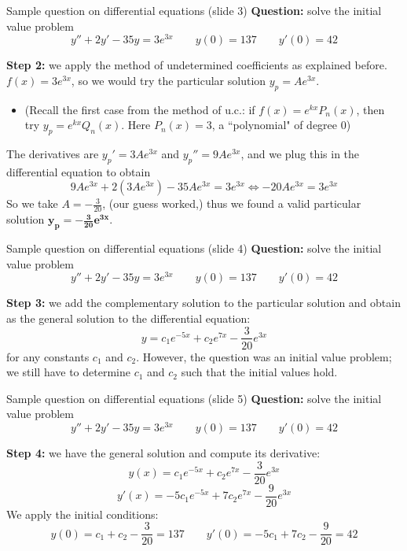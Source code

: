 \begin{frame}{Sample question on differential equations (slide 3)}
    \textbf{Question:} solve the initial value problem \[y''+2y'-35y=3e^{3x}\qquad y(0)=137\qquad y'(0)=42\]
    
    \textbf{Step 2:} we apply the method of undetermined coefficients as explained before. $f(x)=3e^{3x}$, so we would try the particular solution $y_p=Ae^{3x}$.
    \begin{itemize}
    \item{\scriptsize(Recall the first case from the method of u.c.: if $f(x)=e^{kx}P_n(x)$, then try $y_p=e^{kx}Q_n(x)$. Here $P_n(x)=3$, a ``polynomial" of degree 0)}
    \end{itemize}
    The derivatives are $y_p'=3Ae^{3x}$ and $y_p''=9Ae^{3x}$, and we plug this in the differential equation to obtain
    \[9Ae^{3x}+2(3Ae^{3x})-35Ae^{3x}=3e^{3x}\iff-20Ae^{3x}=3e^{3x}\]
    So we take $A=-\frac{3}{20}$, (our guess worked,) thus we found a valid particular solution $\pmb{y_p=-\frac{3}{20}e^{3x}}$.

\end{frame}

\begin{frame}{Sample question on differential equations (slide 4)}
    \textbf{Question:} solve the initial value problem \[y''+2y'-35y=3e^{3x}\qquad y(0)=137\qquad y'(0)=42\]
    
    \textbf{Step 3:} we add the complementary solution to the particular solution and obtain as the general solution to the differential equation: \[y=c_1e^{-5x} + c_2e^{7x}-\frac{3}{20}e^{3x}\] for any constants $c_1$ and $c_2$. However, the question was an initial value problem; we still have to determine $c_1$ and $c_2$ such that the initial values hold.

\end{frame}

\begin{frame}{Sample question on differential equations (slide 5)}
    \textbf{Question:} solve the initial value problem \[y''+2y'-35y=3e^{3x}\qquad y(0)=137\qquad y'(0)=42\]
    
    \textbf{Step 4:} we have the general solution and compute its derivative: \[y(x)=c_1e^{-5x} + c_2e^{7x}-\frac{3}{20}e^{3x}\]  \vspace{-5mm}\[y'(x)=-5c_1e^{-5x}+7c_2e^{7x}-\frac{9}{20}e^{3x}\]
    We apply the initial conditions: \[y(0)=c_1+c_2-\frac{3}{20}=137\quad\quad y'(0)=-5c_1+7c_2-\frac{9}{20}=42\]
    

\end{frame}
\fi
